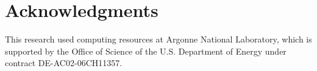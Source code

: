 \section*{Acknowledgments}

This research used computing resources 
at Argonne National Laboratory, which is supported by the Office of Science 
of the U.S. Department of Energy under contract DE-AC02-06CH11357.


